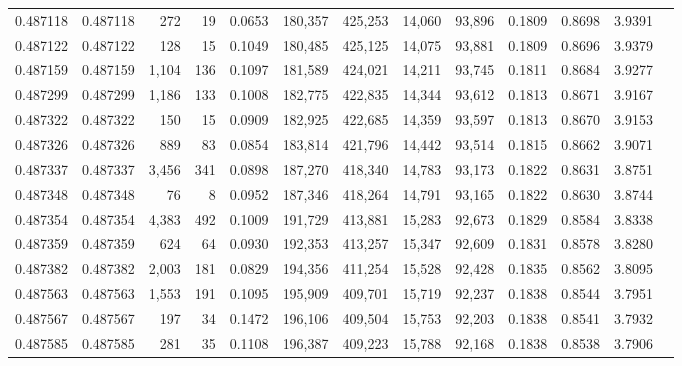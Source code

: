 \begin{tabular}{rrrrrrrrrrrrr}
0.487118 & 0.487118 &   272 &    19 &                                     0.0653 & 180,357 & 425,253 &  14,060 &  93,896 & 0.1809 & 0.8698 & 3.9391 \\
0.487122 & 0.487122 &   128 &    15 &                                     0.1049 & 180,485 & 425,125 &  14,075 &  93,881 & 0.1809 & 0.8696 & 3.9379 \\
0.487159 & 0.487159 & 1,104 &   136 &                                     0.1097 & 181,589 & 424,021 &  14,211 &  93,745 & 0.1811 & 0.8684 & 3.9277 \\
0.487299 & 0.487299 & 1,186 &   133 &                                     0.1008 & 182,775 & 422,835 &  14,344 &  93,612 & 0.1813 & 0.8671 & 3.9167 \\
0.487322 & 0.487322 &   150 &    15 &                                     0.0909 & 182,925 & 422,685 &  14,359 &  93,597 & 0.1813 & 0.8670 & 3.9153 \\
0.487326 & 0.487326 &   889 &    83 &                                     0.0854 & 183,814 & 421,796 &  14,442 &  93,514 & 0.1815 & 0.8662 & 3.9071 \\
0.487337 & 0.487337 & 3,456 &   341 &                                     0.0898 & 187,270 & 418,340 &  14,783 &  93,173 & 0.1822 & 0.8631 & 3.8751 \\
0.487348 & 0.487348 &    76 &     8 &                                     0.0952 & 187,346 & 418,264 &  14,791 &  93,165 & 0.1822 & 0.8630 & 3.8744 \\
0.487354 & 0.487354 & 4,383 &   492 &                                     0.1009 & 191,729 & 413,881 &  15,283 &  92,673 & 0.1829 & 0.8584 & 3.8338 \\
0.487359 & 0.487359 &   624 &    64 &                                     0.0930 & 192,353 & 413,257 &  15,347 &  92,609 & 0.1831 & 0.8578 & 3.8280 \\
0.487382 & 0.487382 & 2,003 &   181 &                                     0.0829 & 194,356 & 411,254 &  15,528 &  92,428 & 0.1835 & 0.8562 & 3.8095 \\
0.487563 & 0.487563 & 1,553 &   191 &                                     0.1095 & 195,909 & 409,701 &  15,719 &  92,237 & 0.1838 & 0.8544 & 3.7951 \\
0.487567 & 0.487567 &   197 &    34 &                                     0.1472 & 196,106 & 409,504 &  15,753 &  92,203 & 0.1838 & 0.8541 & 3.7932 \\
0.487585 & 0.487585 &   281 &    35 &                                     0.1108 & 196,387 & 409,223 &  15,788 &  92,168 & 0.1838 & 0.8538 & 3.7906 \\

\end{tabular}
